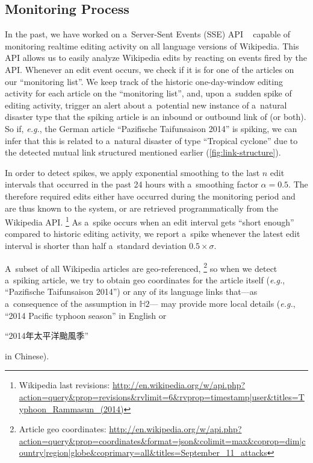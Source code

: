 \documentclass[runningheads,a4paper]{llncs}
\begin{document}
\subsection{Monitoring Process}
\label{sec:monitoring-process}

In the past, we have worked on a~Server-Sent Events (SSE) API%
~\cite{steiner2014bots} capable of monitoring realtime editing activity
on all language versions of Wikipedia.
This API allows us to easily analyze Wikipedia edits
by reacting on events fired by the API.
Whenever an edit event occurs, we check if it is for one of the articles
on our ``monitoring list''. 
We keep track of the historic one-day-window editing activity
for each article on the ``monitoring list'', and,
upon a~sudden spike of editing activity,
trigger an alert about a~potential new instance of a~natural disaster type
that the spiking article is an inbound or outbound link of (or both).
So if, \emph{e.g.}, the German article ``Pazifische Taifunsaison 2014'' is spiking,
we can infer that this is related to a~natural disaster
of type ``Tropical cyclone'' due to the detected
mutual link structured mentioned earlier (\autoref{fig:link-structure}).

In order to detect spikes, we apply exponential smoothing
to the last $n$ edit intervals that occurred in the past 24 hours
with a~smoothing factor $\alpha = 0.5$.
The therefore required edits either have occurred
during the monitoring period and
are thus known to the system,
or are retrieved programmatically from the Wikipedia API.%
\footnote{Wikipedia last revisions:
\url{http://en.wikipedia.org/w/api.php?action=query&prop=revisions&rvlimit=6&rvprop=timestamp|user&titles=Typhoon_Rammasun_(2014)}}
As a~spike occurs when an edit interval gets ``short enough''
compared to historic editing activity,
we report a~spike whenever the latest edit interval
is shorter than half a~standard deviation $0.5 \times \sigma$.

A~subset of all Wikipedia articles are geo-referenced,%
\footnote{Article geo coordinates:
\url{http://en.wikipedia.org/w/api.php?action=query&prop=coordinates&format=json&colimit=max&coprop=dim|country|region|globe&coprimary=all&titles=September_11_attacks}}
so when we detect a~spiking article,
we try to obtain geo coordinates for the article itself
(\emph{e.g.}, ``Pazifische Taifunsaison 2014'')
or any of its language links
that---as a~consequence of the assumption in $\mathbb{H}2$---%
may provide more local details
(\emph{e.g.}, ``2014 Pacific typhoon season'' in English or
\begin{CJK*}{UTF8}{gbsn}``2014年太平洋颱風季''\end{CJK*} in Chinese).
\end{document}
